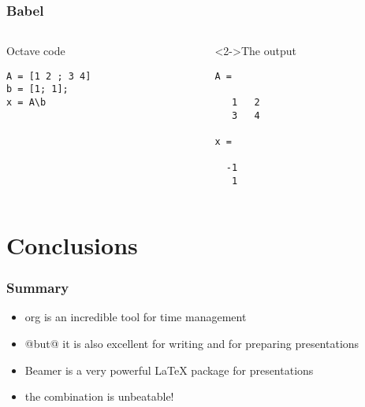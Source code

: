 \documentclass[bigger, english, 10pt, presentation]{beamer}
\begin{document}
\begin{frame}[fragile,t]
\frametitle{Babel}
\label{sec-2-4}
\begin{columns}
\begin{column}{0.45\textwidth}
\begin{block}{Octave code}
\label{sec-2-4-1}


\begin{verbatim}
A = [1 2 ; 3 4]
b = [1; 1];
x = A\b
\end{verbatim}
\end{block}
\end{column}
\begin{column}{0.4\textwidth}
\begin{block}<2->{The output}
\label{sec-2-4-2}



\begin{verbatim}
A =

   1   2
   3   4

x =

  -1
   1
\end{verbatim}
\end{block}
\end{column}
\end{columns}
\end{frame}
\section{Conclusions}
\label{sec-3}
\begin{frame}
\frametitle{Summary}
\label{sec-3-1}

\begin{itemize}
\item org is an incredible tool for time management
\item @but@ it is also excellent for writing and for preparing presentations
\item Beamer is a very powerful \LaTeX{} package for presentations
\item the combination is unbeatable!
\end{itemize}
\end{frame}
\end{document}
